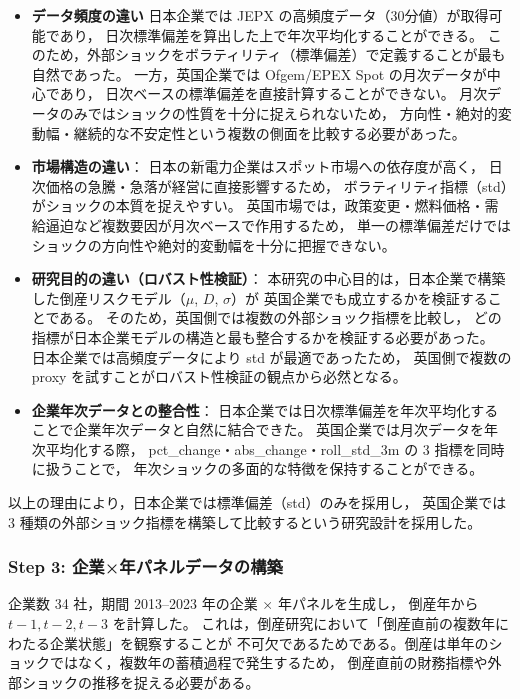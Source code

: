 \begin{itemize}
    \item \textbf{データ頻度の違い}  
    日本企業では JEPX の高頻度データ（30分値）が取得可能であり，
    日次標準偏差を算出した上で年次平均化することができる。
    このため，外部ショックをボラティリティ（標準偏差）で定義することが最も自然であった。  
    一方，英国企業では Ofgem/EPEX Spot の月次データが中心であり，
    日次ベースの標準偏差を直接計算することができない。
    月次データのみではショックの性質を十分に捉えられないため，
    方向性・絶対的変動幅・継続的な不安定性という複数の側面を比較する必要があった。

    \item \textbf{市場構造の違い}：  
    日本の新電力企業はスポット市場への依存度が高く，
    日次価格の急騰・急落が経営に直接影響するため，
    ボラティリティ指標（std）がショックの本質を捉えやすい。  
    英国市場では，政策変更・燃料価格・需給逼迫など複数要因が月次ベースで作用するため，
    単一の標準偏差だけではショックの方向性や絶対的変動幅を十分に把握できない。

    \item \textbf{研究目的の違い（ロバスト性検証）}：  
    本研究の中心目的は，日本企業で構築した倒産リスクモデル（$\mu$, $D$, $\sigma$）が
    英国企業でも成立するかを検証することである。
    そのため，英国側では複数の外部ショック指標を比較し，
    どの指標が日本企業モデルの構造と最も整合するかを検証する必要があった。
    日本企業では高頻度データにより std が最適であったため，
    英国側で複数の proxy を試すことがロバスト性検証の観点から必然となる。

    \item \textbf{企業年次データとの整合性}：  
    日本企業では日次標準偏差を年次平均化することで企業年次データと自然に結合できた。  
    英国企業では月次データを年次平均化する際，
    pct\_change・abs\_change・roll\_std\_3m の 3 指標を同時に扱うことで，
    年次ショックの多面的な特徴を保持することができる。
\end{itemize}

以上の理由により，日本企業では標準偏差（std）のみを採用し，
英国企業では 3 種類の外部ショック指標を構築して比較するという研究設計を採用した。


\subsubsection*{Step 3: 企業×年パネルデータの構築}

企業数 34 社，期間 2013--2023 年の企業 $\times$ 年パネルを生成し，
倒産年から $t-1, t-2, t-3$ を計算した。
これは，倒産研究において「倒産直前の複数年にわたる企業状態」を観察することが
不可欠であるためである。倒産は単年のショックではなく，複数年の蓄積過程で発生するため，
倒産直前の財務指標や外部ショックの推移を捉える必要がある。

